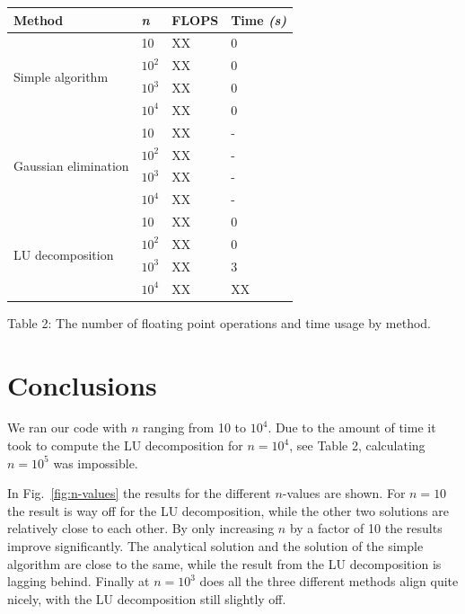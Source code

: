 \documentclass{article}
\begin{document}
\begin{multicols}{2}
\begin{center}
    \begin{tabular}{ l  l  l  l } \hline
    \textbf{Method} 					&\textbf{\textit{n}} 	&\textbf{FLOPS} 	&\textbf{Time \textit{(s)}} \\ \hline
    \multirow{4}{*}{Simple algorithm} 		& 10 				& XX				& 0 \\ 
    								& $10^2$  		& XX 			& 0 \\
    								& $10^3$ 			& XX 			& 0 \\ 
								& $10^4$ 			& XX 			& 0 \\
    \hline
    \multirow{4}{*}{Gaussian elimination} 	& 10				& XX				& - \\ 
    								& $10^2$  		& XX				& - \\
    								& $10^3$ 			& XX 			& - \\ 
								& $10^4$ 			& XX 			& - \\ 
    \hline
    \multirow{4}{*}{LU decomposition} 		& 10				& XX				& 0 \\ 
    								& $10^2$ 			& XX				& 0 \\
    								& $10^3$ 			& XX				& 3 \\ 
								& $10^4$ 			& XX				& XX \\ 
    \hline
    \end{tabular}
\end{center}

\begin{center}
Table 2: The number of floating point operations and time usage by method.
\end{center}


\section{Conclusions} \label{sec:conclusions}
We ran our code with $n$ ranging from 10 to $10^4$. Due to the amount of time it took to compute the LU decomposition for $n = 10^4$, see Table 2, calculating $n = 10^5$ was impossible. 

In Fig.~\ref{fig:n-values} the results for the different $n$-values are shown. For $n = 10$ the result is way off for the LU decomposition, while the other two solutions are relatively close to each other. By only increasing $n$ by a factor of 10 the results improve significantly. The analytical solution and the solution of the simple algorithm are close to the same, while the result from the LU decomposition is lagging behind. Finally at $n = 10^3$ does all the three different methods align quite nicely, with the LU decomposition still slightly off. 


\end{multicols}
\end{document}
